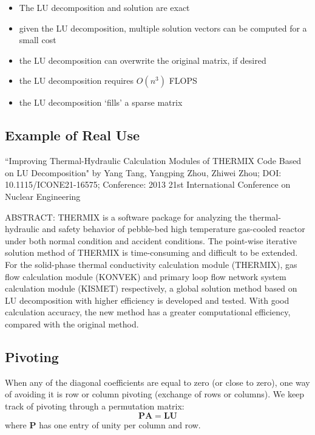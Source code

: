 \documentclass[12pt]{article}
\newcommand{\ve}[1]{\ensuremath{\mathbf{#1}}}
\begin{document}
\begin{itemize}
\item The LU decomposition and solution are exact
\item given the LU decomposition, multiple solution vectors can be computed for a small cost
\item the LU decomposition can overwrite the original matrix, if desired
\item the LU decomposition requires $O(n^3)$ FLOPS
\item the LU decomposition `fills' a sparse matrix
\end{itemize}	

\subsection*{Example of Real Use}
``Improving Thermal-Hydraulic Calculation Modules of THERMIX Code Based on LU Decomposition"
by Yang Tang, Yangping Zhou, Zhiwei Zhou;
DOI: 10.1115/ICONE21-16575; Conference: 2013 21st International Conference on Nuclear Engineering

ABSTRACT: THERMIX is a software package for analyzing the thermal-hydraulic and safety behavior of pebble-bed high temperature gas-cooled reactor under both normal condition and accident conditions. The point-wise iterative solution method of THERMIX is time-consuming and difficult to be extended. For the solid-phase thermal conductivity calculation module (THERMIX), gas flow calculation module (KONVEK) and primary loop flow network system calculation module (KISMET) respectively, a global solution method based on LU decomposition with higher efficiency is developed and tested. With good calculation accuracy, the new method has a greater computational efficiency, compared with the original method.

\subsection*{Pivoting}
When any of the diagonal coefficients are equal to zero (or close to zero), one way of avoiding it is row or column pivoting (exchange of rows or columns). We keep track of pivoting through a permutation matrix:
\[\ve{P}\ve{A} = \ve{L}\ve{U}\]
where $\ve{P}$ has one entry of unity per column and row.
\end{document}
